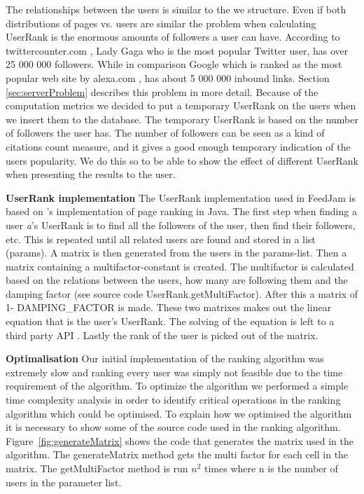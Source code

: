 The relationships between the users is similar to the we structure. Even if both distributions of pages vs. users are similar the problem when calculating UserRank is the enormous amounts of followers a user can have. According to twittercounter.com \citep{TwitterCounter}, Lady Gaga who is the most popular Twitter user, has over 25 000 000 followers. While in comparison Google which is ranked as the most popular web site by alexa.com \citet{AlexaInternet2012}, has about 5 000 000 inbound links. Section \ref{sec:serverProblem}  describes this problem in more detail. Because of the computation metrics we decided to put a temporary UserRank on the users when we insert them to the database. The temporary UserRank is based on the number of followers the user has. The number of followers can be seen as a kind of citations count measure, and it gives a good enough temporary indication of the users popularity. We do this so to be able to show the effect of different UserRank when presenting the results to the user. 

{\bf UserRank implementation}\newline
The UserRank implementation used in FeedJam is based on \citet{Goodrarzi2009}'s implementation of page ranking in Java. The first step when finding a user \emph{a}'s UserRank is to find all the followers of the user, then find their followers, etc. This is repeated until all related users are found and stored in a list (params). A matrix is then generated from the users in the params-list. Then a matrix containing a multifactor-constant is created. The multifactor is calculated based on the relations between the users, how many are following them and the damping factor (see source code UserRank.getMultiFactor). After this a matrix of 1- DAMPING\_FACTOR is made. These two matrixes makes out the linear equation that is the user's UserRank. The solving of the equation is left to a third party API \citep{Jama}. Lastly the rank of the user is picked out of the matrix.

 
{\bf Optimalisation} \newline
Our initial implementation of the ranking algorithm was extremely slow and ranking every user was simply not feasible due to the time requirement of the algorithm. To optimize the algorithm we performed a  simple time complexity analysis in order to identify critical operations in the ranking algorithm which could be optimised. To explain how we optimised the algorithm it is necessary to show some of the source code used in the ranking algorithm. Figure~\ref{fig:generateMatrix} shows the code that generates the matrix used in the algorithm. The generateMatrix method gets the multi factor for each cell in the matrix. The getMultiFactor method is run \(n^2\) times where n is the number of users in the parameter list.

